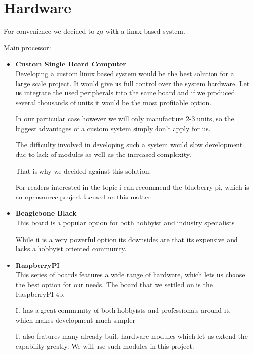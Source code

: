 \clearpage
\section{Hardware}

For convenience we decided to go with a linux based system.

Main processor:
\begin{itemize}
    \item[]
          {\large\textbf{Custom Single Board Computer}}\\
          Developing a custom linux based system would be the best solution for a large scale project.
          It would give us full control over the system hardware. Let us integrate the used peripherals into the same board and if we
          produced several thousands of units it would be the most profitable option.

          In our particular case however we will only manufacture 2-3 units, so the
          biggest advantages of a custom system simply don't apply for us.

          The difficulty involved in developing such a system would slow development due
          to lack of modules as well as the increased complexity.

          That is why we decided against this solution.

          For readers interested in the topic i can recommend the blueberry pi, which is
          an opensource project focused on this matter.

    \item[]
          {\large\textbf{Beaglebone Black}}\\
          This board is a popular option for both hobbyist and industry specialists.

          While it is a very powerful option its downsides are that its expensive and
          lacks a hobbyist oriented community.

    \item[]
          {\large\textbf{RaspberryPI}}\\
          This series of boards features a wide range of hardware, which lets us choose the best option for our needs.
          The board that we settled on is the RaspberryPI 4b.

          It has a great community of both hobbyists and professionals around it, which
          makes development much simpler.

          It also features many already built hardware modules which let us extend the
          capability greatly. We will use such modules in this project.
\end{itemize}